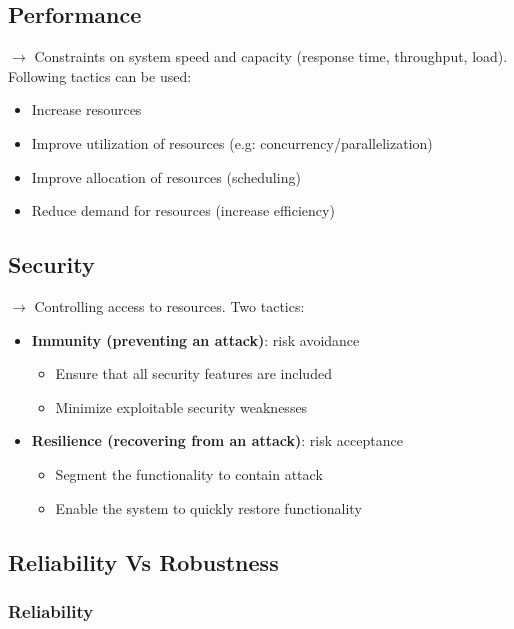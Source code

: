 \subsection{Performance}

$\rightarrow$ Constraints on system speed and capacity (response time, throughput, load).
Following tactics can be used:
\begin{itemize}
	\item Increase resources
	\item Improve utilization of resources (e.g:
        concurrency/parallelization)
	\item Improve allocation of resources (scheduling)
	\item Reduce demand for resources (increase efficiency)
\end{itemize}


\subsection{Security}
$\rightarrow$ Controlling access to resources. Two tactics:

\begin{itemize}
    \item \textbf{Immunity (preventing an attack)}: risk avoidance
        \begin{itemize}
            \item Ensure that all security features are included
            \item Minimize exploitable security weaknesses
        \end{itemize}

    \item \textbf{Resilience (recovering from an attack)}: risk
        acceptance
        \begin{itemize}
            \item Segment the functionality to contain attack
            \item Enable the system to quickly restore functionality
        \end{itemize}
\end{itemize}

\subsection{Reliability Vs Robustness}
\subsubsection{Reliability}

